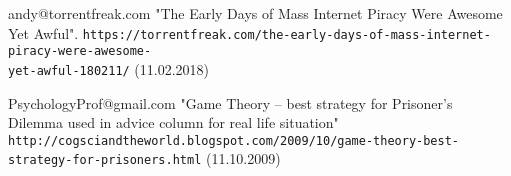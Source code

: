 \documentclass[whitelogo]{tudelft-report}
\theoremstyle{definition}
\theoremstyle{theorem}
\theoremstyle{proposition}
\theoremstyle{corollary}
\theoremstyle{lemma}
\theoremstyle{example}
\theoremstyle{remark}
\begin{document}
\begin{thebibliography}{9}
andy@torrentfreak.com "The Early Days of Mass Internet Piracy Were Awesome Yet Awful". \texttt{https://torrentfreak.com/the-early-days-of-mass-internet-piracy-were-awesome- \\ yet-awful-180211/} (11.02.2018)

PsychologyProf@gmail.com "Game Theory -- best strategy for Prisoner's Dilemma used in advice column for real life situation" \texttt{http://cogsciandtheworld.blogspot.com/2009/10/game-theory-best- \\ strategy-for-prisoners.html} (11.10.2009) 


\end{thebibliography}
\end{document}
